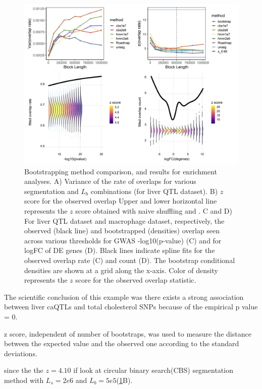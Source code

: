 \begin{figure}[hbtp]
\centering%
\setlength{\abovecaptionskip}{-0.1cm}
\setlength{\belowcaptionskip}{-0.1cm}
\includegraphics[scale=0.25]{Figures/fig2.jpeg}
\caption{
  Bootstrapping method comparison, and results for enrichment
  analyses. 
  A) Variance of the rate of overlaps
  for various segmentation and $L_b$ combinations (for liver QTL dataset).
  B) $z$ score for the observed overlap
  Upper and lower horizontal line represents the $z$ score obtained
  with naive shuffling and .
  C and D) For liver QTL dataset and macrophage dataset, respectively,
  the observed (black line) and bootstrapped (densities) overlap
  seen across various thresholds for GWAS -log10(p-value) (C) and for
  logFC of DE genes (D). Black lines indicate spline fits for the
  observed overlap rate (C) and count (D). The bootstrap conditional
  densities are shown at a grid along the x-axis. Color of density
  represents the $z$ score for the observed overlap statistic.}
\label{fig:result}
\end{figure}

The scientific conclusion of this example was there exists a strong
association between liver caQTLs and total cholesterol SNPs because of
the empirical p value = 0.

z score, independent of number of bootstraps, was used to measure the
distance between the expected value and the observed one according to
the standard deviations.

since the the $z = 4.10$ if look at circular binary search(CBS)
\citep{cbs} segmentation method with $L_s = 2e6$ and
$L_b=5e5$(\cref{fig:result}B).

